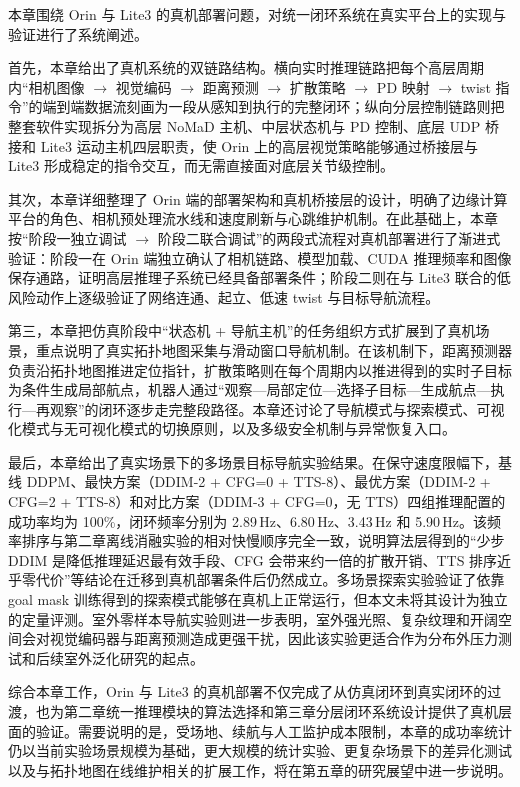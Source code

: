本章围绕 Orin 与 Lite3 的真机部署问题，对统一闭环系统在真实平台上的实现与验证进行了系统阐述。

首先，本章给出了真机系统的双链路结构。横向实时推理链路把每个高层周期内``相机图像 $\to$ 视觉编码 $\to$ 距离预测 $\to$ 扩散策略 $\to$ PD 映射 $\to$ twist 指令''的端到端数据流刻画为一段从感知到执行的完整闭环；纵向分层控制链路则把整套软件实现拆分为高层 NoMaD 主机、中层状态机与 PD 控制、底层 UDP 桥接和 Lite3 运动主机四层职责，使 Orin 上的高层视觉策略能够通过桥接层与 Lite3 形成稳定的指令交互，而无需直接面对底层关节级控制。

其次，本章详细整理了 Orin 端的部署架构和真机桥接层的设计，明确了边缘计算平台的角色、相机预处理流水线和速度刷新与心跳维护机制。在此基础上，本章按``阶段一独立调试 $\to$ 阶段二联合调试''的两段式流程对真机部署进行了渐进式验证：阶段一在 Orin 端独立确认了相机链路、模型加载、CUDA 推理频率和图像保存通路，证明高层推理子系统已经具备部署条件；阶段二则在与 Lite3 联合的低风险动作上逐级验证了网络连通、起立、低速 twist 与目标导航流程。

第三，本章把仿真阶段中``状态机 + 导航主机''的任务组织方式扩展到了真机场景，重点说明了真实拓扑地图采集与滑动窗口导航机制。在该机制下，距离预测器负责沿拓扑地图推进定位指针，扩散策略则在每个周期内以推进得到的实时子目标为条件生成局部航点，机器人通过``观察—局部定位—选择子目标—生成航点—执行—再观察''的闭环逐步走完整段路径。本章还讨论了导航模式与探索模式、可视化模式与无可视化模式的切换原则，以及多级安全机制与异常恢复入口。

最后，本章给出了真实场景下的多场景目标导航实验结果。在保守速度限幅下，基线 DDPM、最快方案（DDIM-2 + CFG=0 + TTS-8）、最优方案（DDIM-2 + CFG=2 + TTS-8）和对比方案（DDIM-3 + CFG=0，无 TTS）四组推理配置的成功率均为 100\%，闭环频率分别为 2.89\,Hz、6.80\,Hz、3.43\,Hz 和 5.90\,Hz。该频率排序与第二章离线消融实验的相对快慢顺序完全一致，说明算法层得到的``少步 DDIM 是降低推理延迟最有效手段、CFG 会带来约一倍的扩散开销、TTS 排序近乎零代价''等结论在迁移到真机部署条件后仍然成立。多场景探索实验验证了依靠 goal mask 训练得到的探索模式能够在真机上正常运行，但本文未将其设计为独立的定量评测。室外零样本导航实验则进一步表明，室外强光照、复杂纹理和开阔空间会对视觉编码器与距离预测造成更强干扰，因此该实验更适合作为分布外压力测试和后续室外泛化研究的起点。

综合本章工作，Orin 与 Lite3 的真机部署不仅完成了从仿真闭环到真实闭环的过渡，也为第二章统一推理模块的算法选择和第三章分层闭环系统设计提供了真机层面的验证。需要说明的是，受场地、续航与人工监护成本限制，本章的成功率统计仍以当前实验场景规模为基础，更大规模的统计实验、更复杂场景下的差异化测试以及与拓扑地图在线维护相关的扩展工作，将在第五章的研究展望中进一步说明。
